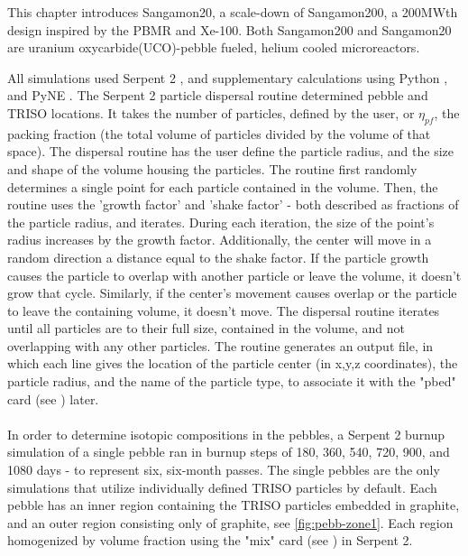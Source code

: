 This chapter introduces Sangamon20, a scale-down of Sangamon200, a 200MWth design inspired by the PBMR and Xe-100.  Both Sangamon200 and Sangamon20 are uranium oxycarbide(UCO)-pebble fueled, helium cooled microreactors.



All simulations used Serpent 2 \cite{leppanenjaakko_serpent_2015}, and supplementary calculations using Python \cite{van_rossum_python_nodate}, \cite{harris_array_2020} and PyNE \cite{scopatz_pyne:_2012}.  The Serpent 2 particle dispersal routine determined pebble and TRISO locations.  It takes the number of particles, defined by the user, or $\eta_{pf}$, the packing fraction (the total volume of particles divided by the volume of that space).  The dispersal routine has the user define the particle radius, and the size and shape of the volume housing the particles.  The routine first randomly determines a single point for each particle contained in the volume.  Then, the routine uses the 'growth factor' and 'shake factor' - both described as fractions of the particle radius, and iterates.  During each iteration, the size of the point's radius increases by the growth factor.  Additionally, the center will move in a random direction a distance equal to the shake factor.  If the particle growth causes the particle to overlap with another particle or leave the volume, it doesn't grow that cycle.  Similarly, if the center's movement causes overlap or the particle to leave the containing volume, it doesn't move.  The dispersal routine iterates until all particles are to their full size, contained in the volume, and not overlapping with any other particles.  The routine generates an output file, in which each line gives the location of the particle center (in x,y,z coordinates), the particle radius, and the name of the particle type, to associate it with the "pbed" card (see \cite{leppanenjaakko_serpent_2015}) later.
\\ \\

In order to determine isotopic compositions in the pebbles, a Serpent 2 burnup simulation of a single pebble ran in burnup steps of 180, 360, 540, 720, 900, and 1080 days - to represent six, six-month passes.  The single pebbles are the only simulations that utilize individually defined TRISO particles by default.  Each pebble has an inner region containing the TRISO particles embedded in graphite, and an outer region consisting only of graphite, see \ref{fig:pebb-zone1}.  Each region homogenized by volume fraction using the "mix" card (see \cite{leppanenjaakko_serpent_2015}) in Serpent 2.

